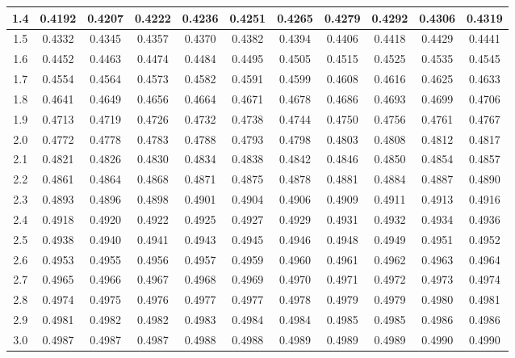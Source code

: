 \documentclass[12pt]{article}
\begin{document}
\begin{center}
\begin{table}
\begin{tabular}{|c||c|c|c|c|c|c|c|c|c|c|}
      1.4 & 0.4192 & 0.4207 & 0.4222 & 0.4236 & 0.4251 & 0.4265 & 0.4279 & 0.4292 & 0.4306 & 0.4319 \\ \hline
      1.5 & 0.4332 & 0.4345 & 0.4357 & 0.4370 & 0.4382 & 0.4394 & 0.4406 & 0.4418 & 0.4429 & 0.4441 \\ \hline
      1.6 & 0.4452 & 0.4463 & 0.4474 & 0.4484 & 0.4495 & 0.4505 & 0.4515 & 0.4525 & 0.4535 & 0.4545 \\ \hline
      1.7 & 0.4554 & 0.4564 & 0.4573 & 0.4582 & 0.4591 & 0.4599 & 0.4608 & 0.4616 & 0.4625 & 0.4633 \\ \hline
      1.8 & 0.4641 & 0.4649 & 0.4656 & 0.4664 & 0.4671 & 0.4678 & 0.4686 & 0.4693 & 0.4699 & 0.4706 \\ \hline
      1.9 & 0.4713 & 0.4719 & 0.4726 & 0.4732 & 0.4738 & 0.4744 & 0.4750 & 0.4756 & 0.4761 & 0.4767 \\ \hline
      2.0 & 0.4772 & 0.4778 & 0.4783 & 0.4788 & 0.4793 & 0.4798 & 0.4803 & 0.4808 & 0.4812 & 0.4817 \\ \hline
      2.1 & 0.4821 & 0.4826 & 0.4830 & 0.4834 & 0.4838 & 0.4842 & 0.4846 & 0.4850 & 0.4854 & 0.4857 \\ \hline
      2.2 & 0.4861 & 0.4864 & 0.4868 & 0.4871 & 0.4875 & 0.4878 & 0.4881 & 0.4884 & 0.4887 & 0.4890 \\ \hline
      2.3 & 0.4893 & 0.4896 & 0.4898 & 0.4901 & 0.4904 & 0.4906 & 0.4909 & 0.4911 & 0.4913 & 0.4916 \\ \hline
      2.4 & 0.4918 & 0.4920 & 0.4922 & 0.4925 & 0.4927 & 0.4929 & 0.4931 & 0.4932 & 0.4934 & 0.4936 \\ \hline
      2.5 & 0.4938 & 0.4940 & 0.4941 & 0.4943 & 0.4945 & 0.4946 & 0.4948 & 0.4949 & 0.4951 & 0.4952 \\ \hline
      2.6 & 0.4953 & 0.4955 & 0.4956 & 0.4957 & 0.4959 & 0.4960 & 0.4961 & 0.4962 & 0.4963 & 0.4964 \\ \hline
      2.7 & 0.4965 & 0.4966 & 0.4967 & 0.4968 & 0.4969 & 0.4970 & 0.4971 & 0.4972 & 0.4973 & 0.4974 \\ \hline
      2.8 & 0.4974 & 0.4975 & 0.4976 & 0.4977 & 0.4977 & 0.4978 & 0.4979 & 0.4979 & 0.4980 & 0.4981 \\ \hline
      2.9 & 0.4981 & 0.4982 & 0.4982 & 0.4983 & 0.4984 & 0.4984 & 0.4985 & 0.4985 & 0.4986 & 0.4986 \\ \hline
      3.0 & 0.4987 & 0.4987 & 0.4987 & 0.4988 & 0.4988 & 0.4989 & 0.4989 & 0.4989 & 0.4990 & 0.4990 \\ \hline
      
    \end{tabular}
  \end{table}
\end{center}
\end{document}
